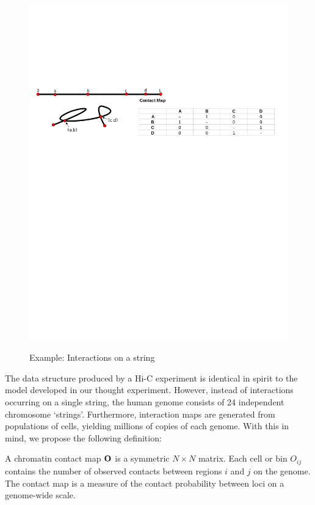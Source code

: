 \begin{figure}[b]
  \centering
  \caption{Example: Interactions on a string}
  \includegraphics[width=\textwidth]{figures/mathematics/strmtx}\label{fig:string}
\end{figure}

The data structure produced by a Hi-C experiment is identical in spirit to the model developed in our thought experiment.  However, instead of
interactions occurring on a single string, the human genome consists of 24 independent chromosome `strings'.  Furthermore, interaction maps are
generated from populations of cells, yielding millions of copies of each genome.  With this in mind, we propose the following definition:

\begin{defn}
  A chromatin contact map $\mathbf{O}$ is a symmetric $N \times N$ matrix.  Each cell or bin $O_{ij}$ contains the number of observed contacts
  between regions $i$ and $j$ on the genome.  The contact map is a measure of the contact probability between loci on a genome-wide scale.
\end{defn}

